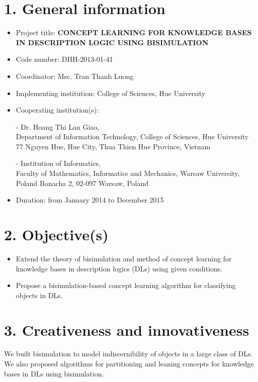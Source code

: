 \section*{1. General information}
\begin{itemize}
	\item Project title: \textbf{CONCEPT LEARNING FOR KNOWLEDGE BASES IN DESCRIPTION LOGIC USING BISIMULATION}\\[-0.8cm]
	\item Code number: DHH-2013-01-41\\[-0.8cm]
	\item Coordinator: Msc. Tran Thanh Luong\\[-0.8cm]
	\item Implementing institution: College of Sciences, Hue University\\[-0.8cm]
	\item Cooperating institution(s):
	
	- Dr. Hoang Thi Lan Giao,\\
	Department of Information Technology, College of Sciences, Hue University\\
	77 Nguyen Hue, Hue City, Thua Thien Hue Province, Vietnam
	
	- Institution of Informatics,\\
	Faculty of Mathematics, Informatics and Mechanics, Warsaw University, Poland
	Banacha 2, 02-097 Warsaw, Poland\\[-0.8cm]
	\item Duration: from January 2014 to December 2015
\end{itemize}
\section*{2. Objective(s)}	
\begin{itemize}
	\item Extend the theory of bisimulation and method of concept learning for knowledge bases in description logics (DLs) using given conditions. 

	\item Propose a bisimulation-based concept learning algorithm for classifying objects in DLs.
\end{itemize}
\section*{3. Creativeness and innovativeness}
We built bisimulation to model indiscernibility of objects in a large class of DLs. We also proposed algorithms for partitioning and leaning concepts for knowledge bases in DLs using bisimulation.
